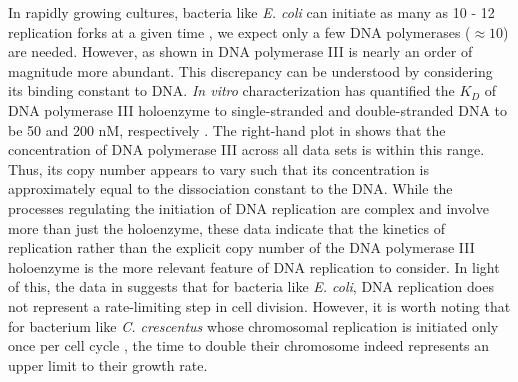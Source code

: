 \begin{figure}
\end{figure}

In rapidly growing cultures, bacteria like \textit{E. coli}
can initiate as many as 10 - 12 replication forks at a
given time \citep{bremer2008, si2017},  we expect only a few DNA polymerases
($\approx 10$) are needed. However, as shown in  DNA
polymerase III is nearly an order of magnitude more abundant. This discrepancy
can be understood by considering its binding constant to DNA. \textit{In vitro} characterization has quantified the $K_D$ of
DNA polymerase III holoenzyme to single-stranded and double-stranded DNA to be
50 and 200 nM, respectively \citep{ason2000}. The right-hand plot in
 shows that the concentration of DNA polymerase III
across all data sets is within this range. Thus, its copy number appears to vary such that its
concentration is approximately equal to the dissociation constant to the DNA.
While the processes regulating the initiation of DNA replication are complex and
involve more than just the holoenzyme, these data indicate that the kinetics of
replication rather than the explicit copy number of the DNA polymerase III
holoenzyme is the more relevant feature of DNA replication to consider. In light
of this, the data in  suggests that for bacteria like
\textit{E. coli}, DNA replication does not represent a rate-limiting step in
cell division. However, it is worth noting that for bacterium like \textit{C.
crescentus} whose chromosomal replication is initiated only once per cell cycle
\citep{jensen2001}, the time to double their chromosome indeed represents an
upper limit to their growth rate.
